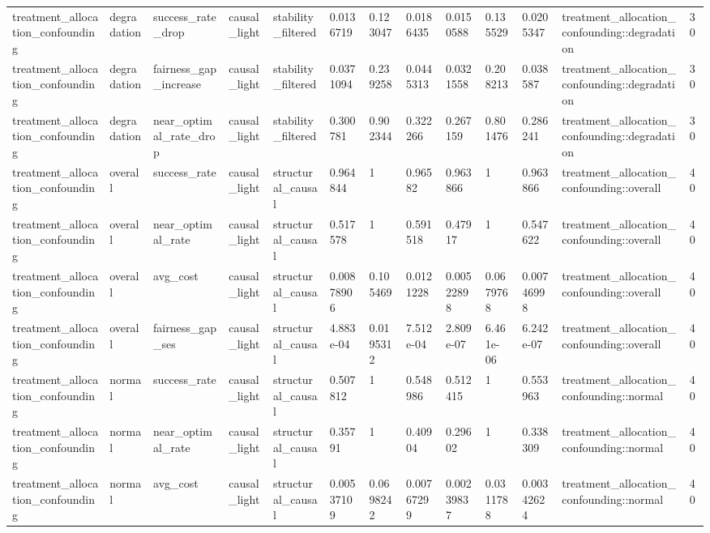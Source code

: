 \begin{tabular}{lllllllllllll}
treatment\_allocation\_confounding & degradation & success\_rate\_drop & causal\_light & stability\_filtered & 0.0136719 & 0.123047 & 0.0186435 & 0.0150588 & 0.135529 & 0.0205347 & treatment\_allocation\_confounding::degradation & 30 \\
treatment\_allocation\_confounding & degradation & fairness\_gap\_increase & causal\_light & stability\_filtered & 0.0371094 & 0.239258 & 0.0445313 & 0.0321558 & 0.208213 & 0.038587 & treatment\_allocation\_confounding::degradation & 30 \\
treatment\_allocation\_confounding & degradation & near\_optimal\_rate\_drop & causal\_light & stability\_filtered & 0.300781 & 0.902344 & 0.322266 & 0.267159 & 0.801476 & 0.286241 & treatment\_allocation\_confounding::degradation & 30 \\
treatment\_allocation\_confounding & overall & success\_rate & causal\_light & structural\_causal & 0.964844 & 1 & 0.96582 & 0.963866 & 1 & 0.963866 & treatment\_allocation\_confounding::overall & 40 \\
treatment\_allocation\_confounding & overall & near\_optimal\_rate & causal\_light & structural\_causal & 0.517578 & 1 & 0.591518 & 0.47917 & 1 & 0.547622 & treatment\_allocation\_confounding::overall & 40 \\
treatment\_allocation\_confounding & overall & avg\_cost & causal\_light & structural\_causal & 0.00878906 & 0.105469 & 0.0121228 & 0.00522898 & 0.0679768 & 0.00746998 & treatment\_allocation\_confounding::overall & 40 \\
treatment\_allocation\_confounding & overall & fairness\_gap\_ses & causal\_light & structural\_causal & 4.883e-04 & 0.0195312 & 7.512e-04 & 2.809e-07 & 6.461e-06 & 6.242e-07 & treatment\_allocation\_confounding::overall & 40 \\
treatment\_allocation\_confounding & normal & success\_rate & causal\_light & structural\_causal & 0.507812 & 1 & 0.548986 & 0.512415 & 1 & 0.553963 & treatment\_allocation\_confounding::normal & 40 \\
treatment\_allocation\_confounding & normal & near\_optimal\_rate & causal\_light & structural\_causal & 0.35791 & 1 & 0.40904 & 0.29602 & 1 & 0.338309 & treatment\_allocation\_confounding::normal & 40 \\
treatment\_allocation\_confounding & normal & avg\_cost & causal\_light & structural\_causal & 0.00537109 & 0.0698242 & 0.00767299 & 0.00239837 & 0.0311788 & 0.00342624 & treatment\_allocation\_confounding::normal & 40 \\

\end{tabular}

